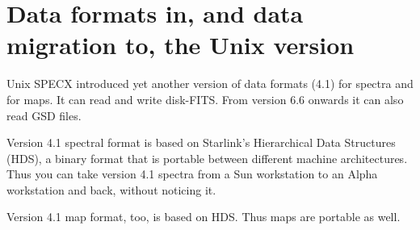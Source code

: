 \section{Data formats in, and data migration to, the Unix version}

Unix SPECX introduced yet another version of data formats (4.1) for
spectra and for maps. It can read and write disk-FITS. From version 6.6
onwards it can also read GSD files.

Version 4.1 spectral format is based on Starlink's Hierarchical Data
Structures (HDS), a binary format that is portable between different
machine architectures. Thus you can take version 4.1 spectra from a Sun
workstation to an Alpha workstation and back, without noticing it.

Version 4.1 map format, too, is based on HDS. Thus maps are portable as
well.

